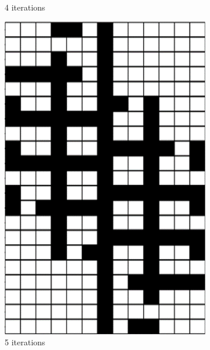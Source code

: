 \begin{figure}[ht]
\begin{subfigure}[t]{0.3\textwidth}
		\caption{4 iterations}
	\end{subfigure}
	\hfill
	\begin{subfigure}[t]{0.3\textwidth}
		\centering
		\includegraphics[width=\textwidth]{si_ls_5.png}
		\caption{5 iterations}
	\end{subfigure}
	\hfill
	\begin{subfigure}[t]{0.3\textwidth}
		\centering

\end{subfigure}
\end{figure}
